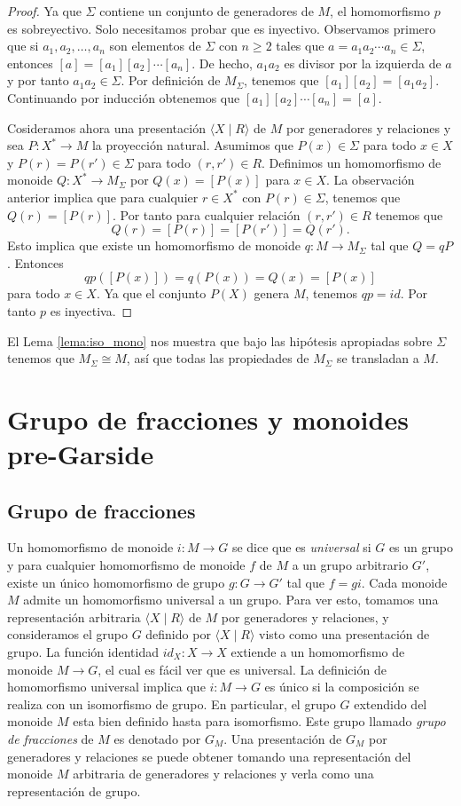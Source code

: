 \documentclass[12pt]{book}
\theoremstyle{definition}
\begin{document}
\begin{proof} Ya que $\Sigma$ contiene un conjunto de generadores de $M$, el homomorfismo $p$ es sobreyectivo. Solo necesitamos probar que es inyectivo. Observamos primero que si $a_1,a_2,\ldots,a_n$ son elementos de $\Sigma$ con $n\geq 2$ tales que $a=a_1a_2\cdots a_n\in\Sigma$, entonces $[a]=[a_1][a_2]\cdots [a_n]$. De hecho, $a_1a_2$ es divisor por la izquierda de $a$ y por tanto $a_1a_2\in\Sigma$. Por definición de $M_\Sigma$, tenemos que $[a_1][a_2]=[a_1a_2]$. Continuando por inducción obtenemos que $[a_1][a_2]\cdots[a_n]=[a]$.

Cosideramos ahora una presentación $\langle X\mid R\rangle$ de $M$ por generadores y relaciones y sea $P:X^*\rightarrow M$ la proyección natural. Asumimos que $P(x)\in\Sigma$ para todo $x\in X$ y $P(r)=P(r')\in\Sigma$ para todo $(r,r')\in R$. Definimos un homomorfismo de monoide $Q:X^*\rightarrow M_\Sigma$ por $Q(x)=[P(x)]$ para $x\in X$. La observación anterior implica que para cualquier $r\in X^*$ con $P(r)\in\Sigma$, tenemos que $Q(r)=[P(r)]$. Por tanto para cualquier relación $(r,r')\in R$ tenemos que
$$Q(r)=[P(r)]=[P(r')]=Q(r').$$
Esto implica que existe un homomorfismo de monoide $q:M\rightarrow M_\Sigma$ tal que $Q=qP$. Entonces
$$qp([P(x)])=q(P(x))=Q(x)=[P(x)]$$
para todo $x\in X$. Ya que el conjunto $P(X)$ genera $M$, tenemos $qp=id$. Por tanto $p$ es inyectiva.
\end{proof}
El Lema \ref{lema:iso_mono} nos muestra que bajo las hipótesis apropiadas sobre $\Sigma$ tenemos que $M_\Sigma\cong M$, así que todas las propiedades de $M_\Sigma$ se transladan a $M$.




\section{Grupo de fracciones y monoides pre-Garside}
\subsection{Grupo de fracciones}

Un homomorfismo de monoide $i:M\rightarrow G$ se dice que es \textit{universal} si $G$ es un grupo y para cualquier homomorfismo de monoide $f$ de $M$ a un grupo arbitrario $G'$, existe un único homomorfismo de grupo $g:G\rightarrow G'$ tal que $f=gi$. Cada monoide $M$ admite un homomorfismo universal a un grupo. Para ver esto, tomamos una representación arbitraria $\langle X \mid R \rangle$ de $M$ por generadores y relaciones, y consideramos el grupo $G$ definido por $\langle X \mid R \rangle$ visto como una presentación de grupo. La función identidad $id_X:X\rightarrow X$ extiende a un homomorfismo de monoide $M\rightarrow G$, el cual es fácil ver que es universal. La definición de homomorfismo universal implica que $i:M\rightarrow G$ es único si la composición se realiza con un isomorfismo de grupo. En particular, el grupo $G$ extendido del monoide $M$ esta bien definido hasta para isomorfismo. Este grupo llamado \textit{grupo de fracciones} de $M$ es denotado por $G_M$. Una presentación de $G_M$ por generadores y relaciones se puede obtener tomando una representación del monoide $M$ arbitraria de generadores y relaciones y verla como una representación de grupo.
\end{document}
